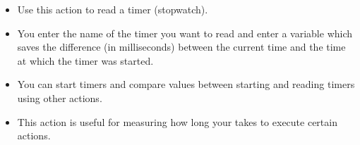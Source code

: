 
\begin{itemize}
\item Use this action to read a timer (stopwatch).
\item You enter the name of the timer you want to read and enter a variable which saves the difference (in milliseconds) between the current time and the time at which the timer was started.  
\item You can start timers and compare values between starting and reading timers using other actions. 
\item This action is useful for measuring how long your \gdaut{} takes to execute certain actions. 
\end{itemize}
